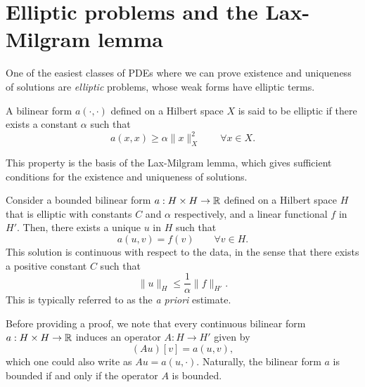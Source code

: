 \section{Elliptic problems and the Lax-Milgram lemma}
One of the easiest classes of PDEs where we can prove existence and uniqueness of solutions are \textit{elliptic} problems, whose weak forms have elliptic terms.
\begin{definition}\label{def:elliptic-form}
A bilinear form $a(\cdot, \cdot)$ defined on a Hilbert space $X$ is said to be elliptic if there exists a constant $\alpha$ such that
\begin{equation}\label{eq:elliptic-form}
    a(x, x) \geq \alpha \| x \|^2_X \qquad \forall x\in X.
\end{equation}
\end{definition}
This property is the basis of the Lax-Milgram lemma, which gives sufficient conditions for the existence and uniqueness of solutions. 
\begin{lemma}\label{lemma:lax-milgram}
    Consider a bounded bilinear form $a: H\times H\to \mathbb{R}$ defined on a Hilbert space $H$ that is elliptic with constants $C$ and $\alpha$ respectively, and a linear functional $f$ in $H'$. Then, there exists a unique $u$ in $H$ such that 
    \begin{equation}\label{eq:lax-milgram-form}
        a(u, v) = f(v) \qquad \forall v \in H.
    \end{equation}
    This solution is continuous with respect to the data, in the sense that there exists a positive constant $C$ such that 
    \begin{equation}\label{eq:lax-milgram-a-priori}
        \| u\|_H \leq \frac 1 \alpha \| f \|_{H'} .
    \end{equation}
    This is typically referred to as the \emph{a priori} estimate. 
\end{lemma}

Before providing a proof, we note that every continuous bilinear form $a:H\times H\to \mathbb{R}$ induces an operator $A:H\to H'$ given by
\begin{equation}\label{eq:form-induced-by-matrix}
    (Au)[v] = a(u,v),
\end{equation}
which one could also write as $Au = a(u, \cdot)$. Naturally, the bilinear form $a$ is bounded if and only if the operator $A$ is bounded. 

